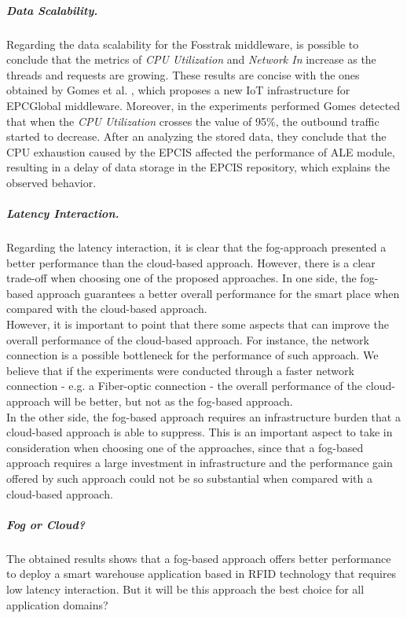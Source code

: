\subparagraph{Data Scalability.}
\label{subp:eval_results_data}
Regarding the data scalability for the Fosstrak middleware, is possible to conclude that the metrics
of \textit{CPU Utilization} and \textit{Network In} increase as the threads and requests are growing.
These results are concise with the ones obtained by Gomes et al. \cite{gomes2014future}, which
proposes a new \gls{IoT} infrastructure for \gls{EPC}Global middleware. Moreover, in the experiments
performed Gomes detected that when the \textit{CPU Utilization} crosses the value of 95$\%$, the
outbound traffic started to decrease. After an analyzing the stored data, they conclude that the
\gls{CPU} exhaustion caused by the \gls{EPCIS} affected the performance of \gls{ALE} module,
resulting in a delay of data storage in the \gls{EPCIS} repository, which explains the observed
behavior.

\subparagraph{Latency Interaction.}
\label{subp:eval_results_latency}
Regarding the latency interaction, it is clear that the fog-approach presented a better performance
than the cloud-based approach. However, there is a clear trade-off when choosing one of the proposed
approaches. In one side, the fog-based approach guarantees a better overall performance for the smart
place when compared with the cloud-based approach.\\

However, it is important to point that there some aspects that can improve the overall performance
of the cloud-based approach. For instance, the network connection is a possible bottleneck for the
performance of such approach. We believe that if the experiments were conducted through a faster
network connection - e.g. a Fiber-optic connection - the overall performance of the cloud-approach
will be better, but not as the fog-based approach.\\

In the other side, the fog-based approach requires an infrastructure burden that a cloud-based approach
is able to suppress. This is an important aspect to take in consideration when choosing one of the
approaches, since that a fog-based approach requires a large investment in infrastructure and the
performance gain offered by such approach could not be so substantial when compared with a cloud-based
approach.\\

\subparagraph{Fog or Cloud?}
\label{subp:eval_conclusion}
The obtained results shows that a fog-based approach offers better performance to deploy a smart
warehouse application based in \gls{RFID} technology that requires low latency interaction.
But it will be this approach the best choice for all application domains?\\

